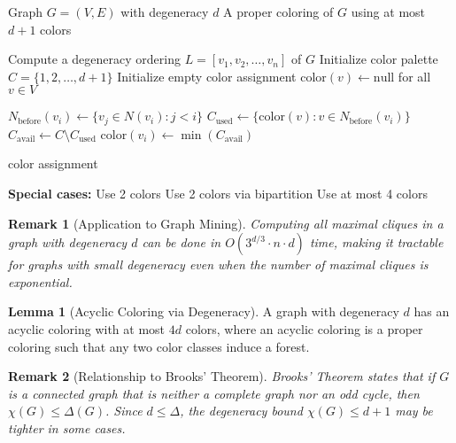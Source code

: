 \documentclass{article}
\newtheorem{remark}{Remark}
\theoremstyle{definition}
\newtheorem{lemma}{Lemma}
\begin{document}
\begin{algorithm}
\caption{Coloring Algorithm for Sparse Graphs}
\label{alg:sparse-graph-coloring}
\begin{algorithmic}[1]
    \Require Graph $G = (V, E)$ with degeneracy $d$
    \Ensure A proper coloring of $G$ using at most $d+1$ colors
    
    \State Compute a degeneracy ordering $L = [v_1, v_2, \ldots, v_n]$ of $G$
    \State Initialize color palette $C = \{1, 2, \ldots, d+1\}$
    \State Initialize empty color assignment $\text{color}(v) \gets \text{null}$ for all $v \in V$
    
        \State $N_{\text{before}}(v_i) \gets \{v_j \in N(v_i) : j < i\}$ 
        \State $C_{\text{used}} \gets \{\text{color}(v) : v \in N_{\text{before}}(v_i)\}$ 
        \State $C_{\text{avail}} \gets C \setminus C_{\text{used}}$ 
        \State $\text{color}(v_i) \gets \min(C_{\text{avail}})$ 
    \EndFor
    
    \State \Return $\text{color}$ assignment
    
    \Statex
    \State \textbf{Special cases:}
        \State Use 2 colors 
        \State Use 2 colors via bipartition
        \State Use at most 4 colors 
    \EndIf
\end{algorithmic}
\end{algorithm}

\begin{remark}[Application to Graph Mining]
Computing all maximal cliques in a graph with degeneracy $d$ can be done in $O(3^{d/3} \cdot n \cdot d)$ time, making it tractable for graphs with small degeneracy even when the number of maximal cliques is exponential.
\end{remark}

\begin{lemma}[Acyclic Coloring via Degeneracy]
A graph with degeneracy $d$ has an acyclic coloring with at most $4d$ colors, where an acyclic coloring is a proper coloring such that any two color classes induce a forest.
\end{lemma}

\begin{remark}[Relationship to Brooks' Theorem]
Brooks' Theorem states that if $G$ is a connected graph that is neither a complete graph nor an odd cycle, then $\chi(G) \leq \Delta(G)$. Since $d \leq \Delta$, the degeneracy bound $\chi(G) \leq d+1$ may be tighter in some cases.
\end{remark}
\end{document}
